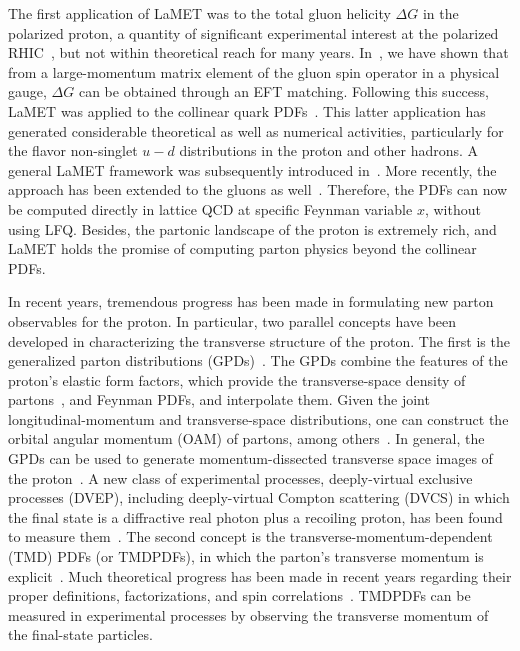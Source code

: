 The first application of LaMET was to the total gluon helicity $\Delta G$ in the
polarized proton, a quantity of significant experimental interest
at the polarized RHIC~\cite{Bunce:2000uv}, but not within
theoretical reach for many years. In~\cite{Ji:2013fga}, we have shown that from a large-momentum
matrix element of the gluon spin operator in a physical gauge,
$\Delta G$ can be obtained through an EFT matching.
Following this success, LaMET
was applied to the collinear quark PDFs~\cite{Ji:2013dva}. This latter application has
generated considerable theoretical as well as numerical activities,
particularly for the flavor non-singlet $u-d$ distributions in the proton
and other hadrons. A general LaMET framework was subsequently introduced in~\cite{Ji:2014gla}.
More recently, the approach has been extended to the gluons as well~\cite{Zhang:2018diq,Li:2018tpe}.
Therefore, the PDFs can now be computed directly in lattice QCD at specific Feynman variable $x$,
without using LFQ. Besides, the partonic landscape of the proton is extremely
rich, and LaMET holds the promise of computing parton physics beyond the collinear PDFs.

In recent years, tremendous progress has been made in formulating new parton observables
for the proton. In particular, two parallel concepts have been developed
in characterizing the transverse structure of the proton. The first is the generalized
parton distributions (GPDs)~\cite{Mueller:1998fv,Ji:1996ek,Radyushkin:1998es}. The GPDs combine the features of the proton's
elastic form factors, which provide the transverse-space density of partons~\cite{Miller:2007uy},
and Feynman PDFs, and interpolate them. Given the joint
longitudinal-momentum and transverse-space distributions,
one can construct the orbital angular momentum (OAM) of partons, among others~\cite{Ji:1996ek}.
In general, the GPDs can be used to generate momentum-dissected transverse space images of the
proton~\cite{Burkardt:2000za}. A new class of experimental processes, deeply-virtual
exclusive processes (DVEP), including deeply-virtual Compton scattering (DVCS) in which the final state
is a diffractive real photon plus a recoiling proton, has been found to
measure them~\cite{Ji:1996ek,Ji:1996nm}.
The second concept is the transverse-momentum-dependent (TMD) PDFs (or TMDPDFs),
in which the parton's transverse momentum is explicit~\cite{Collins:1981uk,Collins:2011zzd}.
Much theoretical progress has been made in recent years regarding their proper definitions, factorizations,
and spin correlations~\cite{Collins:2012uy,Echevarria:2012js,Collins:2017oxh}.
TMDPDFs can be measured in experimental processes by
observing the transverse momentum of the final-state particles.

